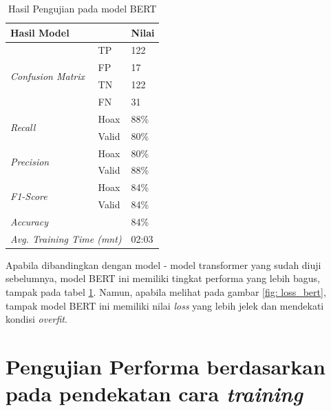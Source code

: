 \begin{table}[h]
    \caption{Hasil Pengujian pada model BERT}
    \label{tab: loss_bert}
    \centering
    \begin{tabular}{|l|l|l|}
        \hline
        \multicolumn{2}{|l|}{\textbf{Hasil Model}}              & \textbf{Nilai}        \\ \hline
        \multirow{4}{*}{\textit{Confusion Matrix}}              & TP             & 122  \\ \cline{2-3}
                                                                & FP             & 17   \\ \cline{2-3}
                                                                & TN             & 122  \\ \cline{2-3}
                                                                & FN             & 31   \\ \hline
        \multirow{2}{*}{\textit{Recall}}                        & Hoax           & 88\% \\ \cline{2-3}
                                                                & Valid          & 80\% \\ \hline
        \multirow{2}{*}{\textit{Precision}}                     & Hoax           & 80\% \\ \cline{2-3}
                                                                & Valid          & 88\% \\ \hline
        \multirow{2}{*}{\textit{F1-Score}}                      & Hoax           & 84\% \\ \cline{2-3}
                                                                & Valid          & 84\% \\ \hline
        \multicolumn{2}{|l|}{\textit{Accuracy}}                 & 84\%                  \\ \hline
        \multicolumn{2}{|l|}{\textit{Avg. Training Time (mnt)}} & 02:03                 \\ \hline
    \end{tabular}
\end{table}

Apabila dibandingkan dengan model - model transformer yang sudah diuji sebelumnya, model BERT ini memiliki tingkat performa yang lebih bagus, tampak pada tabel \ref{tab: loss_bert}. Namun, apabila melihat pada gambar \ref{fig: loss_bert}, tampak model BERT ini memiliki nilai \textit{loss} yang lebih jelek dan mendekati kondisi \textit{overfit}.

\section{Pengujian Performa berdasarkan pada pendekatan cara \textit{training}}

